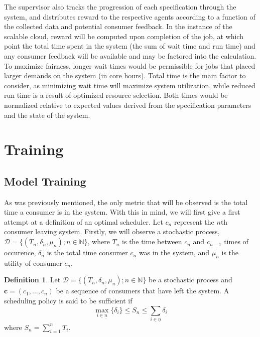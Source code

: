 \documentclass{article}
\theoremstyle{definition}
\newtheorem{definition}{Definition}[section]
\theoremstyle{remark}
\begin{document}
		The supervisor also tracks the progression of each specification through the system, and distributes reward to the respective agents according to a function of the collected data and potential consumer feedback. In the instance of the scalable cloud, reward will be computed upon completion of the job, at which point the total time spent in the system (the sum of wait time and run time) and any consumer feedback will be available and may be factored into the calculation. To maximize fairness, longer wait times would be permissible for jobs that placed larger demands on the system (in core hours). Total time is the main factor to consider, as minimizing wait time will maximize system utilization, while reduced run time is a result of optimized resource selection. Both times would be normalized relative to expected values derived from the specification parameters and the state of the system.

	\section{Training}

		\subsection{Model Training}
		
		As was previously mentioned, the only metric that will be observed is the total time a consumer is in the system. With this in mind, we will first give a first attempt at a definition of an optimal scheduler. Let $c_{n}$ represent the $n$th consumer leaving system. Firstly, we will observe a stochastic process, $\mathcal{D} = \{(T_{n}, \delta_{n}, \mu_{n}); n \in \mathbb{N}\}$, where $T_{n}$ is the time between $c_{n}$ and $c_{n-1}$ times of occurence, $\delta_{n}$ is the total time consumer $c_{n}$ was in the system, and $\mu_{n}$ is the utility of consumer $c_{n}$.
	
		\begin{definition}
			Let $\mathcal{D} = \{(T_{n}, \delta_{n}, \mu_{n}); n \in \mathbb{N}\}$ be a stochastic process and $\mathbf{c} = (c_{1}, \ldots ,c_{n})$ be a sequence of consumers that have left the system. A scheduling policy is said to be sufficient if
			\[
			\max_{i \in \underline{n}}\{\delta_{i}\} \le S_{n} \le \sum_{i \in \underline{n}}{\delta_{i}}
			\] 
			where $S_{n} = \sum_{i=1}^{n}{T_{i}}$.
		\end{definition}
		
\end{document}
